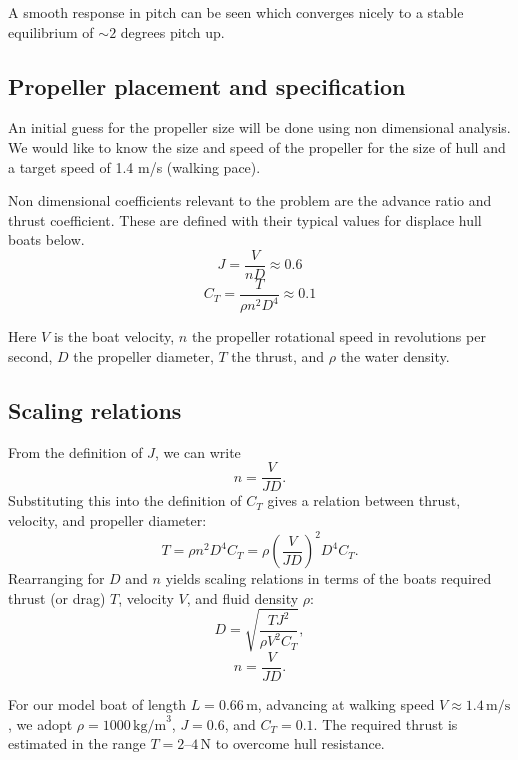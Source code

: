 \documentclass{article}
\begin{document}
A smooth response in pitch can be seen which converges nicely to a stable equilibrium of $\sim2$ degrees pitch up.

\subsection{Propeller placement and specification}

An initial guess for the propeller size will be done using non dimensional analysis.
We would like to know the size and speed of the propeller for the size of hull and a target speed of 1.4 m/s (walking pace).

Non dimensional coefficients relevant to the problem are the advance ratio and thrust coefficient.
These are defined with their typical values for displace hull boats below.
\begin{equation}
    J = \frac{V}{nD} \approx 0.6
\end{equation}
\begin{equation}
    C_T = \frac{T}{\rho n^2 D^4} \approx 0.1
\end{equation}

Here $V$ is the boat velocity, $n$ the propeller rotational speed in revolutions per second, 
$D$ the propeller diameter, $T$ the thrust, and $\rho$ the water density.

\subsection*{Scaling relations}
From the definition of $J$, we can write
\begin{equation}
    n = \frac{V}{J D}.
\end{equation}
Substituting this into the definition of $C_T$ gives a relation between thrust, velocity, and propeller diameter:
\begin{equation}
    T = \rho n^2 D^4 C_T 
      = \rho \left( \frac{V}{J D} \right)^2 D^4 C_T.
\end{equation}
Rearranging for $D$ and $n$ yields scaling relations in terms of the boats required thrust (or drag) $T$, velocity $V$, and fluid density $\rho$:
\begin{equation}
    D = \sqrt{\frac{T J^2}{\rho V^2 C_T}},
\end{equation}
\begin{equation}
    n = \frac{V}{J D}.
\end{equation}

For our model boat of length $L = 0.66\,\text{m}$, advancing at walking speed 
$V \approx 1.4\,\text{m/s}$, we adopt $\rho = 1000\,\text{kg/m}^3$, $J = 0.6$, and $C_T = 0.1$.
The required thrust is estimated in the range $T = 2\text{--}4\,\text{N}$ to overcome hull resistance.
\end{document}
